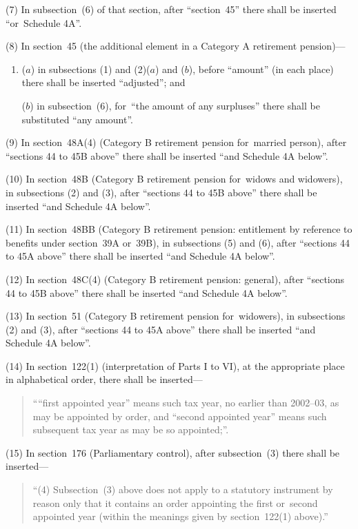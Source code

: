 \documentclass[12pt,a4paper]{article}
\begin{document}
(7) In subsection~(6)  of that section, after “section~45” there shall be inserted “or~Schedule 4A”.

(8) In section~45 (the additional element in a Category A retirement pension)—
\begin{enumerate}\item[]
($a$) in subsections (1)  and (2)($a$)  and ($b$), before “amount” (in each place) there shall be inserted “adjusted”; and

($b$) in subsection~(6), for~“the amount of any surpluses” there shall be substituted “any amount”.
\end{enumerate}

(9) In section~48A(4)  (Category B retirement pension for~married person), after “sections 44 to 45B above” there shall be inserted “and Schedule 4A below”.

(10) In section~48B (Category B retirement pension for~widows and widowers), in subsections (2)  and (3), after “sections 44 to 45B above” there shall be inserted “and Schedule 4A below”.

\pagebreak[3]

(11) In section~48BB (Category B retirement pension: entitlement by reference to benefits under section~39A or~39B), in subsections (5)  and (6), after “sections 44 to 45A above” there shall be inserted “and Schedule 4A below”.

(12) In section~48C(4)  (Category B retirement pension: general), after “sections 44 to 45B above” there shall be inserted “and Schedule 4A below”.

(13) In section~51 (Category B retirement pension for~widowers), in subsections (2)  and (3), after “sections 44 to 45A above” there shall be inserted “and Schedule 4A below”.

(14) In section~122(1)  (interpretation of Parts I to VI), at the appropriate place in alphabetical order, there shall be inserted—
\begin{quotation}
““first appointed year” means such tax year, no earlier than 2002--03, as may be appointed by order, and “second appointed year” means such subsequent tax year as may be so appointed;”.
\end{quotation}

(15) In section~176 (Parliamentary control), after subsection~(3)  there shall be inserted—
\begin{quotation}
“(4) Subsection~(3)  above does not apply to a statutory instrument by reason only that it contains an order appointing the first or~second appointed year (within the meanings given by section~122(1)  above).”
\end{quotation}
\end{document}
